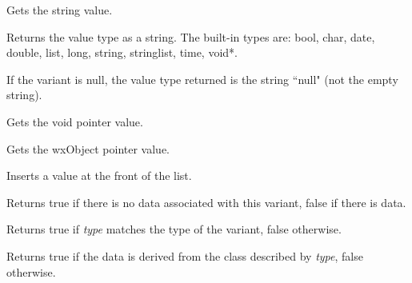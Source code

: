 \label{wxvariantgetstring}


Gets the string value.

\label{wxvariantgettype}


Returns the value type as a string. The built-in types are: bool, char, date, double, list, long, string, stringlist, time, void*.

If the variant is null, the value type returned is the string ``null" (not the empty string).

\label{wxvariantgetvoidptr}


Gets the void pointer value.

\label{wxvariantgetwxobjectptr}


Gets the wxObject pointer value.

\label{wxvariantinsert}


Inserts a value at the front of the list.

\label{wxvariantisnull}


Returns true if there is no data associated with this variant, false if there is data.

\label{wxvariantistype}


Returns true if {\it type} matches the type of the variant, false otherwise.

\label{wxvariantisvaluekindof}


Returns true if the data is derived from the class described by {\it type}, false otherwise.

\label{wxvariantmakenull}

